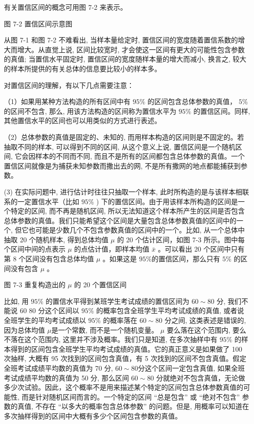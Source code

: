 \documentclass[10pt]{article}
\begin{document}
\begin{CJK*}{UTF8}{bsmi}
有关置信区间的概念可用图 7-2 来表示。

\begin{center}
\end{center}

图 7-2 置信区间示意图

从图 7-1 和图 7-2 不难看出, 当样本量给定时, 置信区间的宽度随着置信系数的增大而增大。从直觉上说, 区间比较宽时, 才会使这一区间有更大的可能性包含参数的真值; 当置信水平固定时, 置信区间的宽度随样本量的增大而减小, 换言之, 较大的样本所提供的有关总体的信息要比较小的样本多。

对置信区间的理解，有以下几点需要注意：

（1）如果用某种方法构造的所有区间中有 $95 \%$ 的区间包含总体参数的真值， $5 \%$ 的区间不包含, 那么, 用该方法构造的区间称为置信水平为 $95 \%$ 的置信区间。同样, 其他置信水平的区间也可以用类似的方式进行表述。

（2）总体参数的真值是固定的、未知的, 而用样本构造的区间则是不固定的。若抽取不同的样本, 可以得到不同的区间, 从这个意义上说, 置信区间是一个随机区间, 它会因样本的不同而不同, 而且不是所有的区间都包含总体参数的真值。一个置信区间就像是为捕获未知参数而撒出去的网, 不是所有撒网的地点都能捕获到参数。

(3) 在实际问题中, 进行估计时往往只抽取一个样本, 此时所构造的是与该样本相联系的一定置信水平（比如 $95 \%$ ) 下的置信区间。由于用该样本所构造的区间是一个特定的区间, 而不再是随机区间, 所以无法知道这个样本所产生的区间是否包含总体参数的真值。我们只能希望这个区间是大量包含总体参数真值的区间中的一个, 但它也可能是少数几个不包含参数真值的区间中的一个。比如, 从一个总体中抽取 20 个随机样本, 得到总体均值 $\mu$ 的 20 个估计区间，如图 7-3 所示。图中每个区间中间的点表示 $\mu$ 的点估计值，即样本均值 $\bar{x}$ 。可以看出 20 个区间中只有第 8 个区间没有包含总体均值 $\mu$ 。如果这是 $95 \%$的置信区间，那么只有 $5 \%$ 的区间没有包含 $\mu$ 。

\begin{center}
\end{center}

图 7-3 重复构造出的 $\mu$ 的 20 个置信区间

比如, 用 $95 \%$ 的置信水平得到某班学生考试成绩的置信区间为 $60 \sim 80$ 分, 我们不能说 60 80 分这个区间以 $95 \%$ 的概率包含全班学生平均考试成绩的真值, 或者说全班学生的平均考试成绩以 $95 \%$ 的概率落在 $60 \sim 80$ 分之间, 这类表述是错误的, 因为总体均值 $\mu$是一个常数, 而不是一个随机变量。 $\mu$ 要么落在这个范围内, 要么不落在这个范围内, 这里并不涉及概率。我们只是知道, 在多次抽样中有 $95 \%$ 的样本得到的区间包含全班学生平均考试成绩的真值。它的真正意义是如果做了 100 次抽样, 大概有 95 次找到的区间包含真值，有 5 次找到的区间不包含真值。假定全班考试成绩平均数的真值为 70 分, $60 \sim 80$分这个区间一定包含真值, 如果全班考试成绩平均数的真值为 50 分, 那么区间 $60 \sim 80$ 分就绝对不包含真值，无论做多少次试验。因此，这个概率不是用来描述某个特定的区间包含总体参数真值的可能性, 而是针对随机区间而言的。一个特定的区间 “总是包含” 或 “绝对不包含” 参数的真值, 不存在 “以多大的概率包含总体参数” 的问题。但是, 用概率可以知道在多次抽样得到的区间中大概有多少个区间包含参数的真值。


\end{CJK*}
\end{document}
